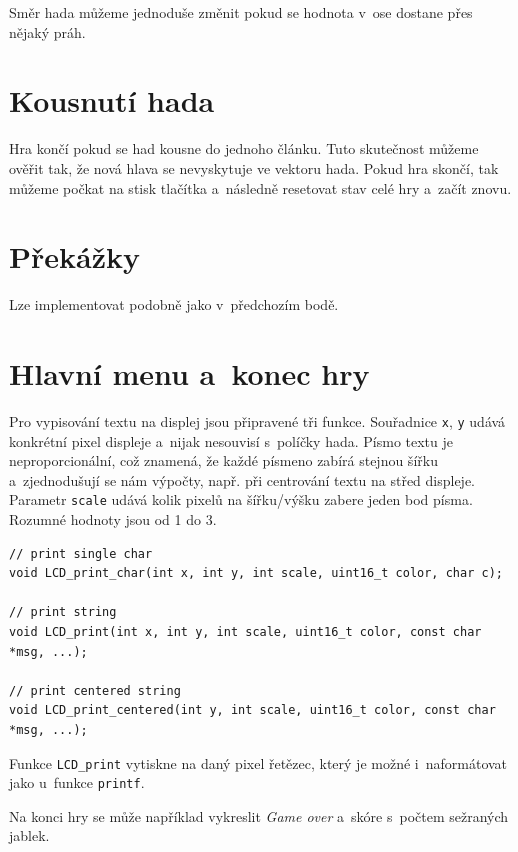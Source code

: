 \documentclass[12pt]{article}
\begin{document}
Směr hada můžeme jednoduše změnit pokud se hodnota v~ose dostane přes nějaký práh.

\section{Kousnutí hada}
Hra končí pokud se had kousne do jednoho článku.
Tuto skutečnost můžeme ověřit tak, že nová hlava se nevyskytuje ve vektoru hada.
Pokud hra skončí, tak můžeme počkat na stisk tlačítka a~následně resetovat stav celé hry a~začít znovu.

\section{Překážky}
Lze implementovat podobně jako v~předchozím bodě.

\section{Hlavní menu a~konec hry}
Pro vypisování textu na displej jsou připravené tři funkce.
Souřadnice \texttt{x}, \texttt{y} udává konkrétní pixel displeje a~nijak nesouvisí s~políčky hada.
Písmo textu je neproporcionální, což znamená, že každé písmeno zabírá stejnou šířku a~zjednodušují se nám výpočty, např. při centrování textu na střed displeje.
Parametr \texttt{scale} udává kolik pixelů na šířku/výšku zabere jeden bod písma.
Rozumné hodnoty jsou od 1 do 3.


\begin{verbatim}
// print single char
void LCD_print_char(int x, int y, int scale, uint16_t color, char c);

// print string
void LCD_print(int x, int y, int scale, uint16_t color, const char *msg, ...);

// print centered string
void LCD_print_centered(int y, int scale, uint16_t color, const char *msg, ...);
\end{verbatim}

Funkce \texttt{LCD\_print} vytiskne na daný pixel řetězec, který je možné i~naformátovat jako u~funkce \texttt{printf}.

Na konci hry se může například vykreslit \textit{Game over} a~skóre s~počtem sežraných jablek.
\end{document}

